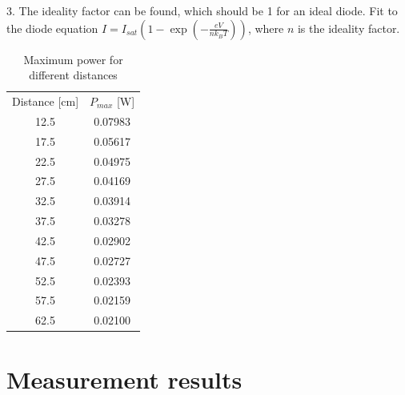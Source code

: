 \documentclass[a4paper]{article}
\begin{document}
3. The ideality factor can be found, which should be 1 for an ideal diode. Fit to the diode equation $I = I_{sat}\left(1-\exp\left(-\frac{eV}{nk_BT}\right)\right)$, where $n$ is the ideality factor.
\begin{table}
  \centering
  \begin{tabular}{|c|c|}
    \hline
    Distance [cm] & $P_{max}$ [W] \\
    12.5 & 0.07983 \\
    17.5 & 0.05617 \\
    22.5 & 0.04975 \\
    27.5 & 0.04169 \\
    32.5 & 0.03914 \\
    37.5 & 0.03278 \\
    42.5 & 0.02902 \\
    47.5 & 0.02727 \\
    52.5 & 0.02393 \\
    57.5 & 0.02159 \\
    62.5 & 0.02100 \\
    \hline
  \end{tabular}
  \caption{Maximum power for different distances}
  \label{tab}
\end{table}
\section{Measurement results}
\end{document}
